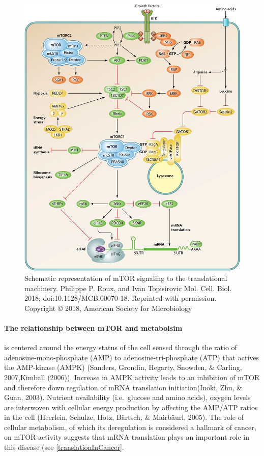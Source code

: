 \documentclass[12pt,openany]{book}
\begin{document}
\begin{figure}
  \includegraphics{./figures/mTORsignal.jpg}
  \caption{Schematic representation of mTOR signaling to the translational machinery. Philippe P. Roux, and Ivan Topisirovic Mol. Cell. Biol. 2018; doi:10.1128/MCB.00070-18. Reprinted with permission. Copyright © 2018, American Society for Microbiology
 \label{fig:mtorsignal}}
\end{figure}\paragraph{The relationship between mTOR and metabolsim}

is centered around the energy status of the cell sensed through the
ratio of adenosine-mono-phosphate (AMP) to adenosine-tri-phosphate (ATP)
that actives the AMP-kinase (AMPK) (Sanders, Grondin, Hegarty, Snowden,
\& Carling, 2007,Kimball (2006)). Increase in AMPK activity leads to an
inhibition of mTOR and therefore down regulation of mRNA translation
initiation(Inoki, Zhu, \& Guan, 2003). Nutrient availability
(i.e.~glucose and amino acids), oxygen levels are interwoven with
cellular energy production by affecting the AMP/ATP ratios in the cell
(Heerlein, Schulze, Hotz, Bärtsch, \& Mairbäurl, 2005). The role of
cellular metabolism, of which its deregulation is considered a hallmark
of cancer, on mTOR activity suggests that mRNA translation plays an
important role in this disease (see \ref{translationInCancer}.
\end{document}
